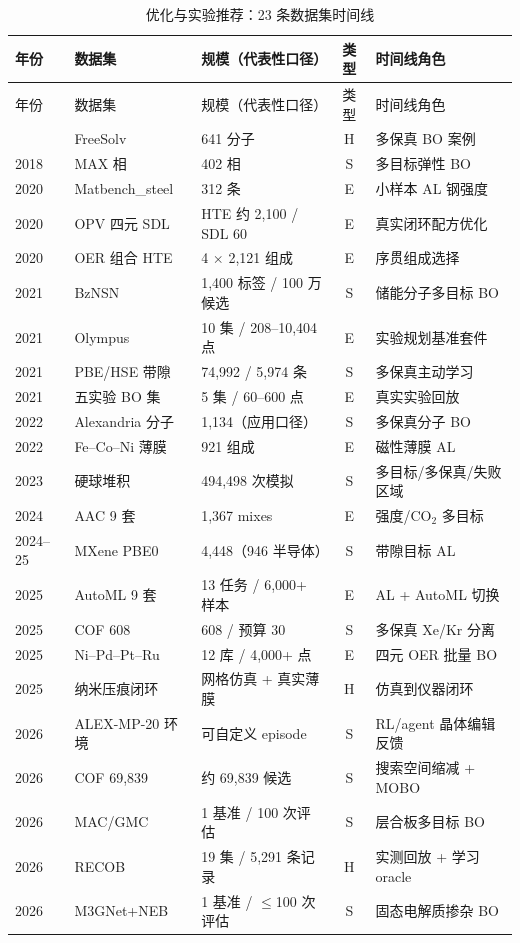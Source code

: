 \documentclass[11pt,a4paper]{ctexart}
\begin{document}
\begin{longtable}{@{}p{1.1cm}p{3.6cm}p{4.3cm}cp{5.4cm}@{}}
\caption{优化与实验推荐：23 条数据集时间线}\\
\toprule
年份 & 数据集 & 规模（代表性口径） & 类型 & 时间线角色 \\
\midrule
\endfirsthead
\toprule
年份 & 数据集 & 规模（代表性口径） & 类型 & 时间线角色 \\
\midrule
\endhead
\bottomrule
\endfoot
2014 & FreeSolv & 641 分子 & H & 多保真 BO 案例 \\
2018 & MAX 相 & 402 相 & S & 多目标弹性 BO \\
2020 & Matbench\_steel & 312 条 & E & 小样本 AL 钢强度 \\
2020 & OPV 四元 SDL & HTE 约 2,100 / SDL 60 & E & 真实闭环配方优化 \\
2020 & OER 组合 HTE & 4 $\times$ 2,121 组成 & E & 序贯组成选择 \\
2021 & BzNSN & 1,400 标签 / 100 万候选 & S & 储能分子多目标 BO \\
2021 & Olympus & 10 集 / 208--10,404 点 & E & 实验规划基准套件 \\
2021 & PBE/HSE 带隙 & 74,992 / 5,974 条 & S & 多保真主动学习 \\
2021 & 五实验 BO 集 & 5 集 / 60--600 点 & E & 真实实验回放 \\
2022 & Alexandria 分子 & 1,134（应用口径） & S & 多保真分子 BO \\
2022 & Fe--Co--Ni 薄膜 & 921 组成 & E & 磁性薄膜 AL \\
2023 & 硬球堆积 & 494,498 次模拟 & S & 多目标/多保真/失败区域 \\
2024 & AAC 9 套 & 1,367 mixes & E & 强度/CO$_2$ 多目标 \\
2024--25 & MXene PBE0 & 4,448（946 半导体） & S & 带隙目标 AL \\
2025 & AutoML 9 套 & 13 任务 / 6,000+ 样本 & E & AL + AutoML 切换 \\
2025 & COF 608 & 608 / 预算 30 & S & 多保真 Xe/Kr 分离 \\
2025 & Ni--Pd--Pt--Ru & 12 库 / 4,000+ 点 & E & 四元 OER 批量 BO \\
2025 & 纳米压痕闭环 & 网格仿真 + 真实薄膜 & H & 仿真到仪器闭环 \\
2026 & ALEX-MP-20 环境 & 可自定义 episode & S & RL/agent 晶体编辑反馈 \\
2026 & COF 69,839 & 约 69,839 候选 & S & 搜索空间缩减 + MOBO \\
2026 & MAC/GMC & 1 基准 / 100 次评估 & S & 层合板多目标 BO \\
2026 & RECOB & 19 集 / 5,291 条记录 & H & 实测回放 + 学习 oracle \\
2026 & M3GNet+NEB & 1 基准 / $\le$100 次评估 & S & 固态电解质掺杂 BO \\
\end{longtable}
\end{document}
